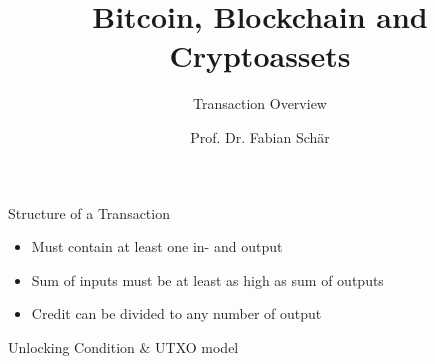 \documentclass[]{beamer}
\title{Bitcoin, Blockchain and Cryptoassets}
\subtitle{Transaction Overview}
\author{Prof. Dr. Fabian Schär}
\institute{University of Basel}
\begin{document}
\thispagestyle{empty}
\begin{frame}[noframenumbering]
	\titlepage
\end{frame}


\begin{frame}{Structure of a Transaction}
	\centering
	\begin{figure}
	
	\end{figure} 
\vspace{1em}
\begin{itemize}
  	\item<2->{Must contain at least one in- and output}
  	\item<3->{Sum of inputs must be at least as high as sum of outputs}
	\item<4->{Credit can be divided to any number of output}
\end{itemize}
\end{frame}	


\begin{frame}{Unlocking Condition \& UTXO model}
\end{frame}       
\end{document}
